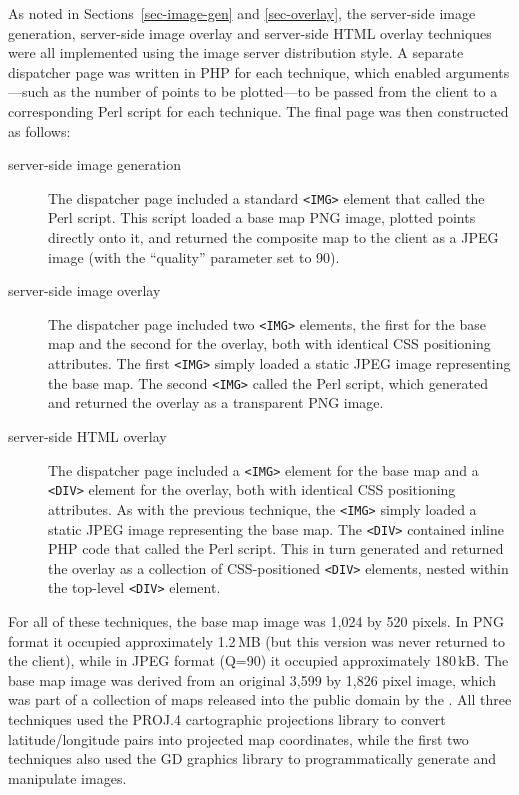 \documentclass[acmnow]{acmtrans2m}
\begin{document}
As noted in Sections~\ref{sec-image-gen} and \ref{sec-overlay}, the
server-side image generation, server-side image overlay and server-side
HTML overlay techniques were all implemented using the image server
distribution style. A separate dispatcher page was written in PHP for
each technique, which enabled arguments---such as the number of points
to be plotted---to be passed from the client to a corresponding Perl
script for each technique. The final page was then constructed as
follows:
\begin{description}

	\item[server-side image generation] The dispatcher page included a
	standard \verb|<IMG>| element that called the Perl script. This
	script loaded a base map PNG image, plotted points directly onto it,
	and returned the composite map to the client as a JPEG image (with
	the ``quality'' parameter set to 90).

	\item[server-side image overlay] The dispatcher page included two
	\verb|<IMG>| elements, the first for the base map and the second for
	the overlay, both with identical CSS positioning attributes. The
	first \verb|<IMG>| simply loaded a static JPEG image representing
	the base map. The second \verb|<IMG>| called the Perl script, which
	generated and returned the overlay as a transparent PNG image.

	\item[server-side HTML overlay] The dispatcher page included a
	\verb|<IMG>| element for the base map and a \verb|<DIV>| element for
	the overlay, both with identical CSS positioning attributes. As with
	the previous technique, the \verb|<IMG>| simply loaded a static JPEG
	image representing the base map. The \verb|<DIV>| contained inline
	PHP code that called the Perl script. This in turn generated and
	returned the overlay as a collection of CSS-positioned \verb|<DIV>|
	elements, nested within the top-level \verb|<DIV>| element.

\end{description}

For all of these techniques, the base map image was 1,024 by 520 pixels.
In PNG format it occupied approximately 1.2\,MB (but this version was
never returned to the client), while in JPEG format (Q=90) it occupied
approximately 180\,kB. The base map image was derived from an original
3,599 by 1,826 pixel image, which was part of a collection of maps
released into the public domain by the . All three
techniques used the PROJ.4 cartographic projections library to convert
latitude/longitude pairs into projected map coordinates, while the first
two techniques also used the GD graphics library to programmatically
generate and manipulate images.
\end{document}
